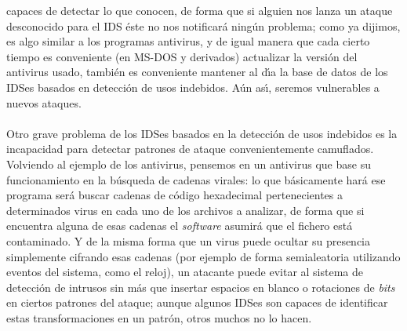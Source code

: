 capaces de detectar lo que conocen, de forma que si alguien nos lanza un ataque
desconocido para el IDS \'este no nos notificar\'a ning\'un problema; como ya
dijimos, es algo similar a los programas antivirus, y de igual manera que cada
cierto tiempo es conveniente (en MS-DOS y derivados) actualizar la versi\'on 
del antivirus usado, tambi\'en es conveniente mantener al d\'{\i}a la base de 
datos de los IDSes basados en detecci\'on de usos indebidos. A\'un as\'{\i},
seremos vulnerables a nuevos ataques.\\
\\Otro grave problema de los IDSes basados en la detecci\'on de usos indebidos
es la incapacidad para detectar patrones de ataque convenientemente camuflados.
Volviendo al ejemplo de los antivirus, pensemos en un antivirus que base su
funcionamiento en la b\'usqueda de cadenas virales: lo que b\'asicamente har\'a
ese programa ser\'a buscar cadenas de c\'odigo hexadecimal pertenecientes a 
determinados virus en cada uno de los archivos a analizar, de forma que si 
encuentra alguna de esas cadenas el {\it software} asumir\'a que el fichero
est\'a contaminado. Y de la misma forma que un virus puede ocultar su presencia
simplemente cifrando esas cadenas (por ejemplo de forma semialeatoria utilizando
eventos del sistema, como el reloj), un atacante puede evitar al sistema de
detecci\'on de intrusos sin m\'as que insertar espacios en blanco o rotaciones 
de {\it bits} en ciertos patrones del ataque; aunque algunos IDSes son capaces
de identificar estas transformaciones en un patr\'on, otros muchos no lo hacen.
